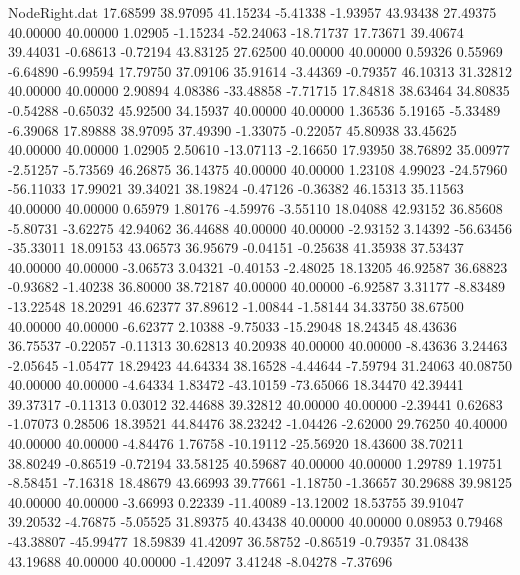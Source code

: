 \begin{filecontents}{NodeRight.dat}
  17.68599   38.97095   41.15234    -5.41338   -1.93957   43.93438   27.49375   40.00000   40.00000    1.02905   -1.15234  -52.24063  -18.71737
  17.73671   39.40674   39.44031    -0.68613   -0.72194   43.83125   27.62500   40.00000   40.00000    0.59326    0.55969   -6.64890   -6.99594
  17.79750   37.09106   35.91614    -3.44369   -0.79357   46.10313   31.32812   40.00000   40.00000    2.90894    4.08386  -33.48858   -7.71715
  17.84818   38.63464   34.80835    -0.54288   -0.65032   45.92500   34.15937   40.00000   40.00000    1.36536    5.19165   -5.33489   -6.39068
  17.89888   38.97095   37.49390    -1.33075   -0.22057   45.80938   33.45625   40.00000   40.00000    1.02905    2.50610  -13.07113   -2.16650
  17.93950   38.76892   35.00977    -2.51257   -5.73569   46.26875   36.14375   40.00000   40.00000    1.23108    4.99023  -24.57960  -56.11033
  17.99021   39.34021   38.19824    -0.47126   -0.36382   46.15313   35.11563   40.00000   40.00000    0.65979    1.80176   -4.59976   -3.55110
  18.04088   42.93152   36.85608    -5.80731   -3.62275   42.94062   36.44688   40.00000   40.00000   -2.93152    3.14392  -56.63456  -35.33011
  18.09153   43.06573   36.95679    -0.04151   -0.25638   41.35938   37.53437   40.00000   40.00000   -3.06573    3.04321   -0.40153   -2.48025
  18.13205   46.92587   36.68823    -0.93682   -1.40238   36.80000   38.72187   40.00000   40.00000   -6.92587    3.31177   -8.83489  -13.22548
  18.20291   46.62377   37.89612    -1.00844   -1.58144   34.33750   38.67500   40.00000   40.00000   -6.62377    2.10388   -9.75033  -15.29048
  18.24345   48.43636   36.75537    -0.22057   -0.11313   30.62813   40.20938   40.00000   40.00000   -8.43636    3.24463   -2.05645   -1.05477
  18.29423   44.64334   38.16528    -4.44644   -7.59794   31.24063   40.08750   40.00000   40.00000   -4.64334    1.83472  -43.10159  -73.65066
  18.34470   42.39441   39.37317    -0.11313    0.03012   32.44688   39.32812   40.00000   40.00000   -2.39441    0.62683   -1.07073    0.28506
  18.39521   44.84476   38.23242    -1.04426   -2.62000   29.76250   40.40000   40.00000   40.00000   -4.84476    1.76758  -10.19112  -25.56920
  18.43600   38.70211   38.80249    -0.86519   -0.72194   33.58125   40.59687   40.00000   40.00000    1.29789    1.19751   -8.58451   -7.16318
  18.48679   43.66993   39.77661    -1.18750   -1.36657   30.29688   39.98125   40.00000   40.00000   -3.66993    0.22339  -11.40089  -13.12002
  18.53755   39.91047   39.20532    -4.76875   -5.05525   31.89375   40.43438   40.00000   40.00000    0.08953    0.79468  -43.38807  -45.99477
  18.59839   41.42097   36.58752    -0.86519   -0.79357   31.08438   43.19688   40.00000   40.00000   -1.42097    3.41248   -8.04278   -7.37696

\end{filecontents}
